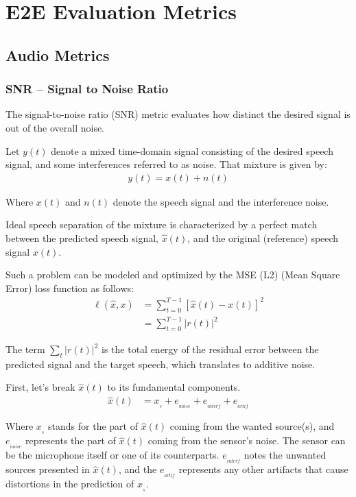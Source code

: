 \chapter{E2E Evaluation Metrics}\label{ch:metrics}
\section{Audio Metrics}
\subsection{SNR -- Signal to Noise Ratio}
The signal-to-noise ratio (SNR) metric evaluates how
distinct the desired signal is out of the overall noise.

Let \(y(t)\) denote a mixed time-domain signal consisting of
the desired speech signal, and some interferences
referred to as noise.
That mixture is given by:
\begin{align}
    y(t) = x(t) + n(t)
\end{align}

Where \(x(t)\) and \(n(t)\) denote the speech signal and the
interference noise.

Ideal speech separation of the mixture is characterized by
a perfect match between the predicted speech signal, \(\widehat{x}(t)\), 
and the original (reference) speech signal \(x(t)\).

Such a problem can be modeled and optimized 
by the MSE (L2) (Mean Square Error) loss function as follows:
\begin{align}
    \ell(\widehat{x}, x) & = \sum_{t=0}^{T-1} \left[\widehat{x}(t) - x(t)\right]^{2} \\
    & = \sum_{t=0}^{T-1} |r(t)|^{2}
\end{align}

The term \(\sum_{t} |r(t)|^{2}\) 
is the total energy of the residual error between 
the predicted signal and the target speech,
which translates to additive noise.

First, let's break \(\widehat{x}(t)\) to its fundamental components\cite{1643671}.
\begin{align}
    \widehat{x}(t) & = x_{_{s}} + e_{_{noise}} + e_{_{interf}} + e_{_{artif}}
\end{align}

Where \(x_{_{s}}\) stands for the
part of \(\widehat{x}(t)\) coming from the 
wanted source(s), and \(e_{_{noise}}\) represents the part 
of \(\widehat{x}(t)\) coming from the sensor's noise. The sensor
can be the microphone itself or one of its counterparts.
\(e_{_{interf}}\) notes the unwanted sources presented
in \(\widehat{x}(t)\), and the \(e_{_{artif}}\)
represents any other artifacts that cause
distortions in the prediction of \(x_{_{s}}\).

